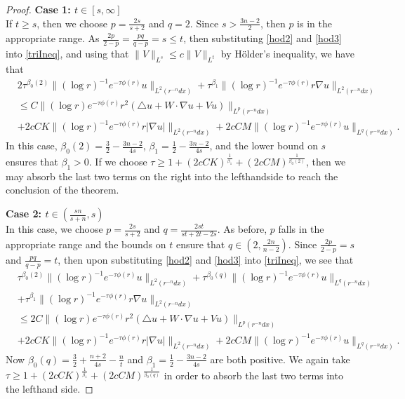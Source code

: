 \documentclass[11pt]{amsart}
\theoremstyle{plain}
\numberwithin{equation}{section}
\begin{document}
\begin{proof}
{\bf Case 1: $t \in {\left[{s, {\infty}}\right]}$} \\
If $t \ge s$, then we choose $p = \frac{2s}{s+2}$ and $q = 2$.
Since $s > \frac{3n-2}{2}$, then $p$ is in the appropriate range.
As $\frac{2p}{2-p} = \frac{pq}{q-p} = s \le t$, then substituting \eqref{hod2} and \eqref{hod3} into \eqref{triIneq}, and using that $\|V\|_{L^{s}} \le c \|V\|_{L^{t}}$ by H\"older's inequality, we have that
\begin{align*}
&2\tau^{{\beta}_0{\left( {2} \right) }} \|(\log r)^{-1} e^{-\tau \phi(r)}u\|_{L^2(r^{-n}dx)}
+\tau^{{\beta}_1} \|(\log r )^{-1} e^{-\tau \phi(r)}r \nabla u\|_{L^2(r^{-n}dx)} \nonumber \\
&\le C\|(\log r) e^{-\tau \phi(r)} r^2 (\triangle u+ W\cdot \nabla u + V u)\|_{L^p(r^{-n} dx)} \nonumber \\
&+ 2 c C K \|(\log r)^{-1} e^{-\tau \phi(r)} r |\nabla u|\|_{L^2(r^{-n} dx)}
+ 2 c C M \|(\log r)^{-1} e^{-\tau \phi(r)} u\|_{L^q(r^{-n} dx)}.
\end{align*}
In this case, ${\beta}_0{\left( {2} \right) } = \frac{3}{2} - \frac{3n-2}{4s}$, ${\beta}_1 = \frac{1}{2} - \frac{3n-2}{4s}$, and the lower bound on $s$ ensures that ${\beta}_1 > 0$.
If we choose $\tau \ge 1 + {\left( {2 c C K} \right) }^{\frac 1 {{\beta}_1}}+ {\left( {2 c C M} \right) }^{\frac 1 {{\beta}_0{\left( {2} \right) }}} $, then we may absorb the last two terms on the right into the lefthandside to reach the conclusion of the theorem.

{\bf Case 2: $t \in {\left( {\frac{sn}{s+n}, s} \right) }$} \\
In this case, we choose $p = \frac{2s}{s+2}$ and $q = \frac{2st}{st+2t-2s}$.
As before, $p$ falls in the appropriate range and the bounds on $t$ ensure that $q \in {\left( {2, \frac{2n}{n-2}} \right) }$.
Since $\frac{2p}{2-p} = s$ and $\frac{pq}{q-p} = t$, then upon substituting \eqref{hod2} and \eqref{hod3} into \eqref{triIneq}, we see that
\begin{align}
&\tau^{{\beta}_0{\left( {2} \right) }} \|(\log r)^{-1} e^{-\tau \phi(r)}u\|_{L^2(r^{-n}dx)}
+\tau^{{\beta}_0{\left( {q} \right) }} \|(\log r)^{-1} e^{-\tau \phi(r)}u\|_{L^q(r^{-n}dx)} \nonumber \\
&+\tau^{{\beta}_1} \|(\log r )^{-1} e^{-\tau \phi(r)}r \nabla u\|_{L^2(r^{-n}dx)} \nonumber \\
&\le 2 C\|(\log r) e^{-\tau \phi(r)} r^2 (\triangle u+ W\cdot \nabla u + V u)\|_{L^p(r^{-n} dx)} \nonumber \\
&+ 2 c C K \|(\log r)^{-1} e^{-\tau \phi(r)} r |\nabla u|\|_{L^2(r^{-n} dx)}
+ 2 c C M \|(\log r)^{-1} e^{-\tau \phi(r)} u\|_{L^q(r^{-n} dx)}.
\label{boundSub}
\end{align}
Now ${\beta}_0{\left( {q} \right) } = \frac 3 2 + \frac{n+2}{4s} - \frac n t$ and ${\beta}_1 =\frac{1}{2}-\frac{3n-2}{4s}$ are both positive.
We again take $\tau \ge 1 + {\left( {2 c C K} \right) }^{\frac 1 {{\beta}_1}}+ {\left( {2 c C M} \right) }^{\frac 1 {{\beta}_0{\left( {q} \right) }}} $ in order to absorb the last two terms into the lefthand side.


\end{proof}
\end{document}
